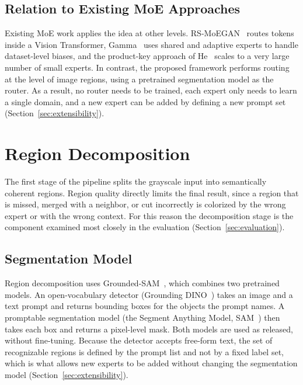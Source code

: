 \documentclass{FastFyp}
\begin{document}
\subsection{Relation to Existing MoE Approaches}

Existing MoE work applies the idea at other levels. RS-MoEGAN~\cite{ref16} routes tokens inside a Vision Transformer, Gamma~\cite{ref15} uses shared and adaptive experts to handle dataset-level biases, and the product-key approach of He~\cite{ref14} scales to a very large number of small experts. In contrast, the proposed framework performs routing at the level of image regions, using a pretrained segmentation model as the router. As a result, no router needs to be trained, each expert only needs to learn a single domain, and a new expert can be added by defining a new prompt set (Section~\ref{sec:extensibility}).

\section{Region Decomposition}
\label{sec:decomposition}

The first stage of the pipeline splits the grayscale input into semantically coherent regions. Region quality directly limits the final result, since a region that is missed, merged with a neighbor, or cut incorrectly is colorized by the wrong expert or with the wrong context. For this reason the decomposition stage is the component examined most closely in the evaluation (Section~\ref{sec:evaluation}).

\subsection{Segmentation Model}

Region decomposition uses Grounded-SAM~\cite{ref17}, which combines two pretrained models. An open-vocabulary detector (Grounding DINO~\cite{liu2024groundingdino}) takes an image and a text prompt and returns bounding boxes for the objects the prompt names. A promptable segmentation model (the Segment Anything Model, SAM~\cite{kirillov2023sam}) then takes each box and returns a pixel-level mask. Both models are used as released, without fine-tuning. Because the detector accepts free-form text, the set of recognizable regions is defined by the prompt list and not by a fixed label set, which is what allows new experts to be added without changing the segmentation model (Section~\ref{sec:extensibility}).
\end{document}
